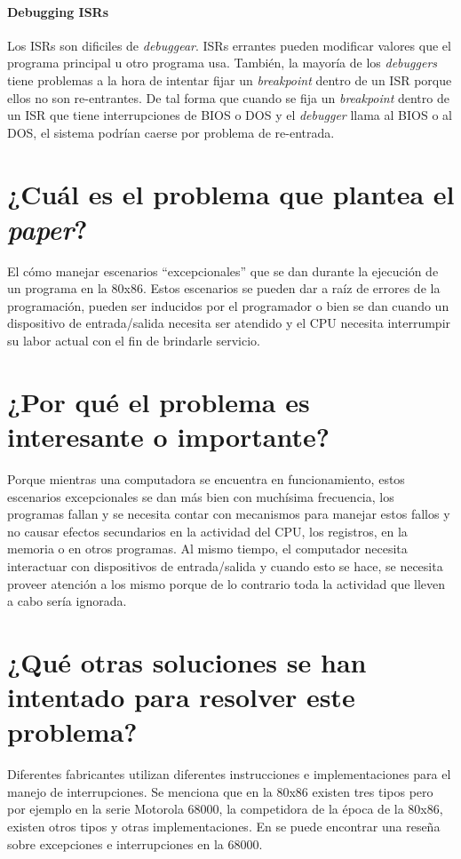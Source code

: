 \paragraph{Debugging ISRs}
Los ISRs son dificiles de \textit{debuggear}. ISRs errantes pueden modificar valores que el programa principal u otro programa usa. También, la mayoría de los \textit{debuggers} tiene problemas a la hora de intentar fijar un \textit{breakpoint} dentro de un ISR porque ellos no son re-entrantes. De tal forma que cuando se fija un \textit{breakpoint} dentro de un ISR que tiene interrupciones de BIOS o DOS y el \textit{debugger} llama al BIOS o al DOS, el sistema podrían caerse por problema de re-entrada.

\section{¿Cuál es el problema que plantea el \textit{paper}?}
El cómo manejar escenarios ``excepcionales'' que se dan durante la ejecución de un programa en la 80x86. Estos escenarios se pueden dar a raíz de errores de la programación, pueden ser inducidos por el programador o bien se dan cuando un dispositivo de entrada/salida necesita ser atendido y el CPU necesita interrumpir su labor actual con el fin de brindarle servicio.

\section{¿Por qué el problema es interesante o importante?}
Porque mientras una computadora se encuentra en funcionamiento, estos escenarios excepcionales se dan más bien con muchísima frecuencia, los programas fallan y se necesita contar con mecanismos para manejar estos fallos y no causar efectos secundarios en la actividad del CPU, los registros, en la memoria o en otros programas. Al mismo tiempo, el computador necesita interactuar con dispositivos de entrada/salida y cuando esto se hace, se necesita proveer atención a los mismo porque de lo contrario toda la actividad que lleven a cabo sería ignorada.  

\section{¿Qué otras soluciones se han intentado para resolver este problema?}
Diferentes fabricantes utilizan diferentes instrucciones e implementaciones para el manejo de interrupciones. Se menciona que en la 80x86 existen tres tipos pero por ejemplo en la serie Motorola 68000, la competidora de la época de la 80x86, existen otros tipos y otras implementaciones. En \cite{antic} se puede encontrar una reseña sobre excepciones e interrupciones en la 68000.

